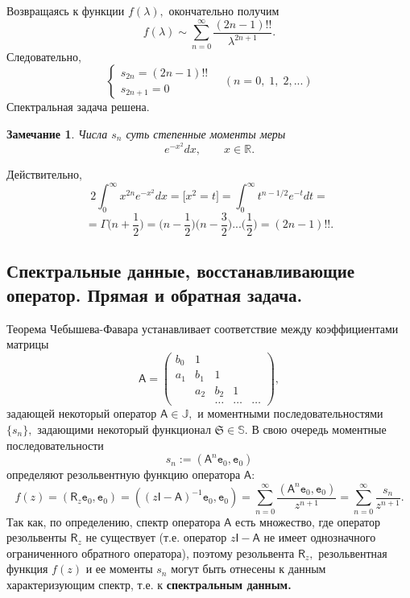 \documentclass[12pt,a4paper]{article}
\theoremstyle{plain}   \newtheorem{Pro}{Задача}
\newtheorem{Rem}{Замечание}
\begin{document}
Возвращаясь к функции
$ f(\lambda ) , $
окончательно получим
$$
  f(\lambda ) \sim \sum _{n=0}^{\infty}
  \frac{(2n-1)!!}{\lambda ^{2n+1}}.
$$
Следовательно,
$$
  \begin{cases}
    s_{2n}=(2n-1)!! \\
	s_{2n+1}=0
  \end{cases}
  \quad (n=0, \; 1, \; 2,...)
$$
Спектральная задача решена.
\begin{Rem}
Числа
$ s_n $
суть степенные моменты меры
$$
  e^{-x^2}dx, \qquad x \in \mathbb{R}.
$$
\end{Rem}
Действительно,
$$
  2 \int _0 ^{\infty} x^{2n}e^{-x^2}dx=
  \biggl [ x^2 =t \biggr ] =
  \int _0 ^{\infty} t^{n-1/2}e^{-t}dt=
$$
$$
  =\Gamma \biggl ( n+\frac{1}{2} \biggr )=
  \biggl (n-\frac{1}{2} \biggr )
  \biggl (n-\frac{3}{2} \biggr )...
  \biggl ( \frac{1}{2} \biggr ) =
  (2n-1)!! .
$$
\newpage
\subsection{Спектральные данные, восстанавливающие \\
оператор.
Прямая и обратная задача.}
$$ \; $$
Теорема Чебышева-Фавара устанавливает соответствие между
коэффициентами матрицы
\begin{equation*}
  \mathsf{A}=
    \begin{pmatrix}
	  b_0 & 1 & \; & \; & \; \\
	  a_1 & b_1 & 1 & \; & \; \\
	  \; & a_2 & b_2 & 1 & \; \\
	  \; & \; & \dots & \dots & \dots
	\end{pmatrix},
\end{equation*}
задающей некоторый оператор
$ \mathsf{A} \in \mathbb{J} , $
и моментными последовательностями
$ \{ s_n \} , $
задающими некоторый функционал
$ \mathfrak{S} \in \mathbb{S}. $
В свою очередь моментные последовательности
$$
  s_n := ( \mathsf{A}^n \mathtt{e}_0 , \mathtt{e}_0 )
$$
определяют резольвентную функцию оператора
$ \mathsf{A}: $
$$
  f(z)=(\mathsf{R}_z \mathtt{e}_0 , \mathtt{e}_0 )=
    ((z \mathsf{I}-\mathsf{A})^{-1} \mathtt{e}_0 , \mathtt{e}_0 )=
	  \sum _{n=0}^{\infty}\frac
	    {(\mathsf{A}^n \mathtt{e}_0 , \mathtt{e}_0 )}
		  {z^{n+1}}=
		    \sum _{n=0}^{\infty}
			  \frac{s_n}{z^{n+1}}.
$$
Так как, по определению, спектр оператора
$ \mathsf{A} $
есть множество, где оператор резольвенты
$ \mathsf{R}_z $
не существует (т.е. оператор
$ z\mathsf{I}-\mathsf{A} $
не имеет однозначного ограниченного обратного оператора),
поэтому резольвента
$ \mathsf{R}_z , $
резольвентная функция
$ f(z)  $
и ее моменты
$ s_n $
могут быть отнесены к данным характеризующим спектр, т.е. к
{\bfseries спектральным данным.} \\
\end{document}
